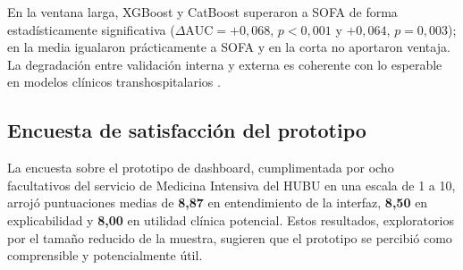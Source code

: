 \documentclass[
  spanish,
  a4paper,
  12pt,
  twoside]{memoir}
\begin{document}
\begin{table}[htbp]
  \centering
  \caption{Validación externa (eICU-CRD): métricas probabilísticas y de calibración de cada modelo.}
  \label{tab:externa-probabilistica}
\end{table}

En la ventana larga, XGBoost y CatBoost superaron a SOFA de forma estadísticamente significativa ($\Delta\mathrm{AUC}=+0{,}068$, $p<0{,}001$ y
$+0{,}064$, $p=0{,}003$); en la media igualaron prácticamente a SOFA y en la corta no aportaron ventaja. La degradación entre validación interna y externa
es coherente con lo esperable en modelos clínicos transhospitalarios \cite{rockenschaub2025}.

\subsection*{Encuesta de satisfacción del prototipo}

La encuesta sobre el prototipo de dashboard, cumplimentada por ocho facultativos del servicio de Medicina Intensiva del HUBU en una escala de 1 a
10, arrojó puntuaciones medias de \textbf{8,87} en entendimiento de la interfaz, \textbf{8,50} en explicabilidad y \textbf{8,00} en utilidad clínica
potencial. Estos resultados, exploratorios por el tamaño reducido de la muestra, sugieren que el prototipo se percibió como comprensible y potencialmente útil.
\end{document}
